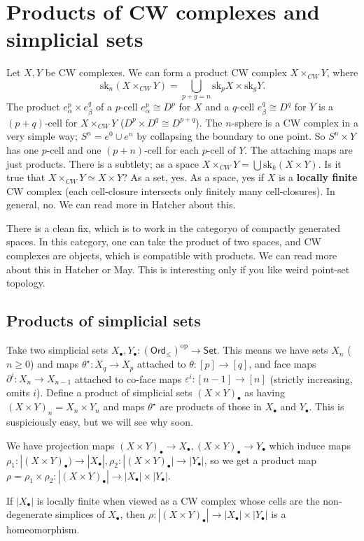 \section{Products of CW complexes and simplicial sets} 
Let $X,Y$ be CW complexes. We can form a product CW complex $X \times _{CW}Y$, where \[
    \mathrm{sk}_n (X \times _{CW}Y) = \bigcup_{p+g=n} \mathrm{sk}_pX \times \mathrm{sk}_gY.
\] The product $e_{\alpha }^p \times e_{\beta }^q$ of a $p$-cell $e_{\alpha }^p \cong D^p$ for $X$ and a $q$-cell $e_{\beta }^q \cong D^q$ for $Y$ is a $(p+q)$-cell for $X \times _{CW}Y$ ($D^p \times D^q \cong D^{p+q}$). The $n$-sphere is a CW complex in a very simple way; $S^n =e^0 \cup e^n $ by collapsing the boundary to one point. So $S^n  \times Y$ has one $p$-cell and one $(p+n)$-cell for each $p$-cell of $Y$. The attaching maps are just products. There is a subtlety; as a space $X \times _{CW}Y = \bigcup \mathrm{sk}_k(X\times Y)$. Is it true that $X\times _{CW}Y \simeq X\times Y$? As a set, yes. As a space, yes if $X$ is a \textbf{locally finite} CW complex (each cell-closure intersects only finitely many cell-closures). In general, no. We can read more in Hatcher about this.

There is a clean fix, which is to work in the categoryo of compactly generated spaces. In this category, one can take the product of two spaces, and CW complexes are objects, which is compatible with products. We can read more about this in Hatcher or May. This is interesting only if you like weird point-set topology.

 \subsection{Products of simplicial sets}
 Take two simplicial sets $X_{\bullet},Y_{\bullet} \colon (\mathsf{Ord} _{\leq})^{\mathrm{op}} \to \mathsf{Set} $. This means we have sets $X_n $ ($n\geq 0$) and maps $\theta ^{\star} \colon X_q  \to X_p$ attached to $\theta \colon [p] \to [q]$, and face maps $\partial ^i  \colon X_n  \to X_{n-1}$ attached to co-face maps $\varepsilon ^i \colon [n-1] \to [n]$ (strictly increasing, omits $i$).
 Define a product of simplicial sets $(X\times Y)_{\bullet}$ as having $(X \times Y)_n =X_n  \times Y_n $ and maps $\theta ^{\star}$ are products of those in  $X_{\bullet}$ and $Y_{\bullet}$. This is suspiciously easy, but we will see why soon.

 We have projection maps $(X \times Y)_{\bullet}\to X_{\bullet},(X\times Y)_{\bullet}\to Y_{\bullet}$ which induce maps $\rho_1 \colon |(X\times Y)_{\bullet}) \to |X_{\bullet}|, \rho_2 \colon |(X\times Y)_{\bullet}| \to |Y_{\bullet}|$, so we get a product map $\rho=\rho_1 \times \rho_2 \colon |(X\times Y)_{\bullet}| \to |X_{\bullet}| \times |Y_{\bullet}|$.
 \begin{theorem}
     If $|X_{\bullet}|$ is locally finite when viewed as a CW complex whose cells are the non-degenerate simplices of $X_{\bullet}$, then  $\rho \colon |(X \times Y)_{\bullet}| \to |X_{\bullet}|\times |Y_{\bullet}|$ is a homeomorphism.
 \end{theorem}

